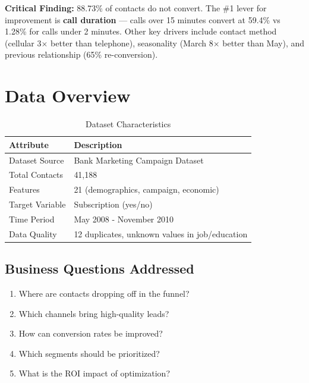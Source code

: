 \documentclass[11pt,a4paper]{article}
\begin{document}
\begin{tcolorbox}[
    colback=dropred!5,
    colframe=dropred!40,
    arc=8pt,
    left=12pt,
    right=12pt
]
\textbf{Critical Finding:} 88.73\% of contacts do not convert. The \#1 lever for improvement is \textbf{call duration} — calls over 15 minutes convert at 59.4\% vs 1.28\% for calls under 2 minutes. Other key drivers include contact method (cellular 3$\times$ better than telephone), seasonality (March 8$\times$ better than May), and previous relationship (65\% re-conversion).
\end{tcolorbox}

\section{Data Overview}

\begin{table}[H]
\centering
\begin{tabular}{p{4cm} p{6cm}}
\toprule
\rowcolor{primary!10}
\textbf{Attribute} & \textbf{Description} \\
\midrule
Dataset Source & Bank Marketing Campaign Dataset \\
Total Contacts & 41,188 \\
Features & 21 (demographics, campaign, economic) \\
Target Variable & Subscription (yes/no) \\
Time Period & May 2008 - November 2010 \\
Data Quality & 12 duplicates, unknown values in job/education \\
\bottomrule
\end{tabular}
\caption{Dataset Characteristics}
\end{table}

\subsection{Business Questions Addressed}
\begin{enumerate}[label=\color{accent}\textbf{Q\arabic*:}, leftmargin=*]
    \item Where are contacts dropping off in the funnel?
    \item Which channels bring high-quality leads?
    \item How can conversion rates be improved?
    \item Which segments should be prioritized?
    \item What is the ROI impact of optimization?
\end{enumerate}
\end{document}
